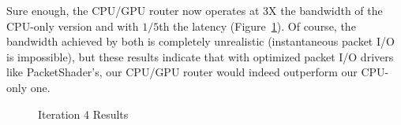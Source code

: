 Sure enough, the CPU/GPU router now operates at 3X the bandwidth of the
CPU-only version and with $1/5$th the latency (Figure~\ref{fig:iter4}). Of
course, the bandwidth achieved by both is completely unrealistic (instantaneous
packet I/O is impossible), but these results indicate that with optimized
packet I/O drivers like PacketShader's, our CPU/GPU router would indeed
outperform our CPU-only one.

\begin{figure}
    \centering
	\quad

    \caption{Iteration 4 Results}
	\label{fig:iter4}
\end{figure}
